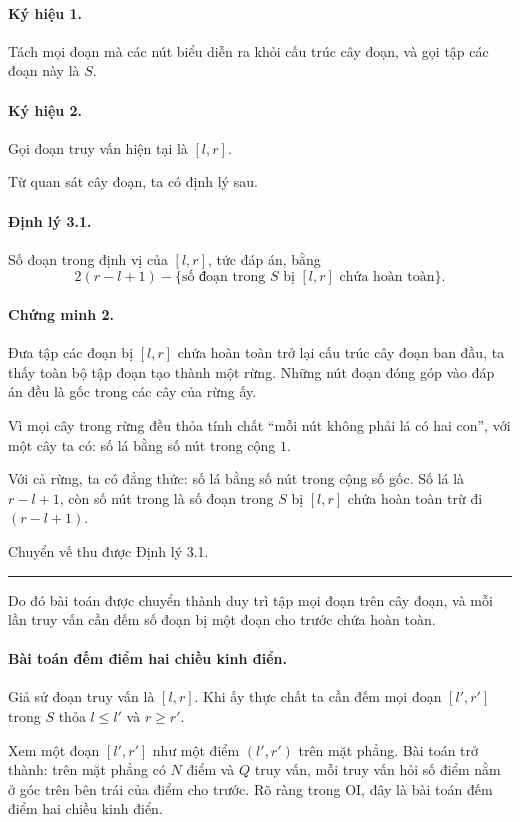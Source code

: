 \documentclass[11pt]{article}
\newcommand{\qedmark}{\hfill\rule{0.7ex}{0.7ex}}
\begin{document}
\paragraph{Ký hiệu 1.}
Tách mọi đoạn mà các nút biểu diễn ra khỏi cấu trúc cây đoạn, và gọi tập các
đoạn này là \(S\).

\paragraph{Ký hiệu 2.}
Gọi đoạn truy vấn hiện tại là \([l,r]\).

Từ quan sát cây đoạn, ta có định lý sau.

\paragraph{Định lý 3.1.}
Số đoạn trong định vị của \([l,r]\), tức đáp án, bằng
\[
  2(r-l+1)-\{\text{số đoạn trong }S\text{ bị }[l,r]\text{ chứa hoàn toàn}\}.
\]

\paragraph{Chứng minh 2.}
Đưa tập các đoạn bị \([l,r]\) chứa hoàn toàn trở lại cấu trúc cây đoạn ban
đầu, ta thấy toàn bộ tập đoạn tạo thành một rừng. Những nút đoạn đóng góp vào
đáp án đều là gốc trong các cây của rừng ấy.

Vì mọi cây trong rừng đều thỏa tính chất ``mỗi nút không phải lá có hai con'',
với một cây ta có: số lá bằng số nút trong cộng \(1\).

Với cả rừng, ta có đẳng thức: số lá bằng số nút trong cộng số gốc. Số lá là
\(r-l+1\), còn số nút trong là số đoạn trong \(S\) bị \([l,r]\) chứa hoàn toàn
trừ đi \((r-l+1)\).

Chuyển vế thu được Định lý 3.1. \qedmark

Do đó bài toán được chuyển thành duy trì tập mọi đoạn trên cây đoạn, và mỗi
lần truy vấn cần đếm số đoạn bị một đoạn cho trước chứa hoàn toàn.

\paragraph{Bài toán đếm điểm hai chiều kinh điển.}
Giả sử đoạn truy vấn là \([l,r]\). Khi ấy thực chất ta cần đếm mọi đoạn
\([l',r']\) trong \(S\) thỏa \(l\le l'\) và \(r\ge r'\).

Xem một đoạn \([l',r']\) như một điểm \((l',r')\) trên mặt phẳng. Bài toán trở
thành: trên mặt phẳng có \(N\) điểm và \(Q\) truy vấn, mỗi truy vấn hỏi số điểm
nằm ở góc trên bên trái của điểm cho trước. Rõ ràng trong OI, đây là bài toán
đếm điểm hai chiều kinh điển.
\end{document}
